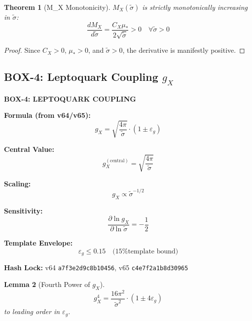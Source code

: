\documentclass[11pt,letterpaper]{article}
\newtheorem{theorem}{Theorem}[section]
\newtheorem{lemma}[theorem]{Lemma}
\newcommand{\st}{\tilde{\sigma}}
\newcommand{\eps}{\varepsilon}
\begin{document}
\begin{theorem}[M_X Monotonicity]
\label{thm:mx-monotone}
$M_X(\st)$ is strictly monotonically increasing in $\st$:
\begin{equation}
\frac{dM_X}{d\st} = \frac{C_X \mu_*}{2\sqrt{\st}} > 0 \quad \forall \st > 0
\label{eq:mx-monotone}
\end{equation}
\end{theorem}

\begin{proof}
Since $C_X > 0$, $\mu_* > 0$, and $\st > 0$, the derivative is manifestly positive.
\end{proof}

\subsection{BOX-4: Leptoquark Coupling $g_X$}
\label{subsec:box4}

\begin{closurebox}
\textbf{BOX-4: LEPTOQUARK COUPLING}

\textbf{Formula (from v64/v65):}
\begin{equation}
\boxed{
g_X = \sqrt{\frac{4\pi}{\st}} \cdot (1 \pm \eps_g)
}
\label{eq:box4-gx}
\end{equation}

\textbf{Central Value:}
\begin{equation}
g_X^{(\text{central})} = \sqrt{\frac{4\pi}{\st}}
\label{eq:gx-central}
\end{equation}

\textbf{Scaling:}
\begin{equation}
g_X \propto \st^{-1/2}
\label{eq:gx-scaling}
\end{equation}

\textbf{Sensitivity:}
\begin{equation}
\frac{\partial \ln g_X}{\partial \ln \st} = -\frac{1}{2}
\label{eq:gx-sensitivity}
\end{equation}

\textbf{Template Envelope:}
\begin{equation}
\eps_g \leq 0.15 \quad \text{(15\% template bound)}
\label{eq:eps-g-bound}
\end{equation}

\textbf{Hash Lock:} v64 \texttt{a7f3e2d9c8b10456}, v65 \texttt{c4e7f2a1b8d30965}
\end{closurebox}

\begin{lemma}[Fourth Power of $g_X$]
\label{lem:gx-fourth}
\begin{equation}
g_X^4 = \frac{16\pi^2}{\st^2} \cdot (1 \pm 4\eps_g)
\label{eq:gx-fourth}
\end{equation}
to leading order in $\eps_g$.
\end{lemma}
\end{document}
